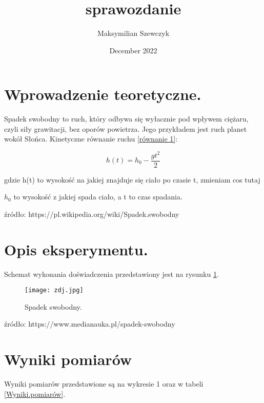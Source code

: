 \documentclass{article}
\title{sprawozdanie}
\author{Maksymilian Szewczyk}
\date{December 2022}
\begin{document}
\maketitle

\section{Wprowadzenie teoretyczne.}

Spadek swobodny to ruch, który odbywa się wyłacznie pod wpływem ciężaru, czyli siły grawitacji, bez oporów powietrza. Jego przykładem jest ruch planet wokół Słońca. Kinetyczne równanie ruchu \ref{równanie 1}:

\begin{equation}
\label{równanie 1}
    h(t) = h_0 - \frac{gt^2}{2}
\end{equation}    


gdzie h(t) to wysokość na jakiej znajduje się ciało po czasie t, zmieniam cos tutaj

$h_0$ to wysokość z jakiej spada ciało, a t to czas spadania.

\vspace{5mm} %

źródło: https://pl.wikipedia.org/wiki/Spadek.swobodny

\section{Opis eksperymentu.}

Schemat wykonania doświadczenia przedstawiony jest na rysunku \ref{spadek.swobodny}.

\begin{figure}[htbp]
\texttt{[image: zdj.jpg]}
\centering
\caption{Spadek swobodny.}
\label{spadek.swobodny}
\end{figure}

\vspace{5mm} %
źródło: https://www.medianauka.pl/spadek-swobodny 

\section{Wyniki pomiarów}

Wyniki pomiarów przedstawione są na wykresie 1 oraz w tabeli \ref{Wyniki.pomiarów}.

\end{document}
